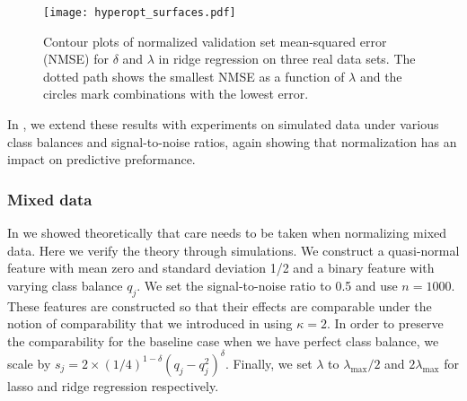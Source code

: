 
\begin{figure}[htpb]
  \centering
  \texttt{[image: hyperopt\_surfaces.pdf]}
  \caption{%
    Contour plots of normalized validation set mean-squared error (NMSE)
    for \(\delta\) and \(\lambda\) in ridge regression on
    three real data sets. The
    dotted path shows the smallest NMSE as a function of \(\lambda\) and the circles mark
    combinations with the lowest error.
  }
  \label{fig:hyperopt-contours}
\end{figure}


In , we extend these results with experiments on
simulated data under various class balances and signal-to-noise ratios, again showing that
normalization has an impact on predictive preformance.

\subsubsection{Mixed data}\label{sec:experiments-mixed-data}

In  we showed theoretically that care needs to be taken when
normalizing mixed data. Here we verify the theory through simulations. We construct a
quasi-normal feature with mean zero and standard deviation 1/2 and a binary feature with
varying class balance \(q_j\). We set the signal-to-noise ratio to 0.5 and use \(n =
\num{1000}\). These features are constructed so that their effects are comparable under the
notion of comparability that we introduced in  using \(\kappa = 2\).
In order to preserve the comparability for the baseline case when we have perfect class
balance, we scale by \(s_j = 2 \times (1/4)^{1-\delta}(q_j-q_j^2)^\delta\). Finally, we set
\(\lambda\) to \(\lambda_\text{max}/2\) and \(2\lambda_\text{max}\) for lasso and ridge
regression respectively.

